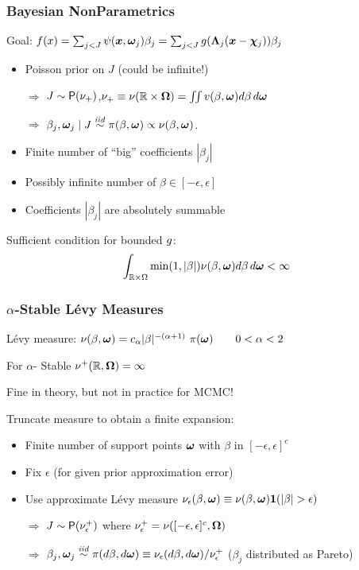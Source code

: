 \documentclass[handout]{beamer}
\newcommand{\bs}[2]{\begin{frame} \frametitle{#1}
{#2}
\end{frame} }
\begin{document}
\bs{Bayesian NonParametrics}{
Goal: $f(x) = \sum_{j < J}  \psi(\bm x, \bm \omega_j) \beta_j = \sum_{j <
  J} g(\bm \Lambda_j(\bm x - \bm \chi_j)) \beta_j$
\pause


\pause

\begin{itemize}
\item Poisson prior on $J$  (could be infinite!)
\item[$\Rightarrow$] $J \sim \mbox{\sf P}(\nu_+)$,\qquad $\nu_+\equiv
  \nu(\mathbb{R}\times\bm \Omega) = \iint v(\beta, \bm \omega) d \beta \,
  d\bm \omega$  \pause
\item[$\Rightarrow$] $\beta_j,\bm \omega_j \mid J \mathrel{\mathop{\sim}\limits^{\mathit{iid}}} \pi(\beta, \bm \omega)
  \propto \nu(\beta,\bm \omega)$. \pause
\end{itemize}

\begin{itemize}
  \item Finite number of ``big'' coefficients $|\beta_j|$ \pause
  \item Possibly infinite number of $\beta \in [-\epsilon, \epsilon]$ \pause
  \item Coefficients $|\beta_j|$ are absolutely summable \pause
 \end{itemize}

{Sufficient condition} for bounded $g$:
\begin{equation}
  \label{eq:l1-bound}
\int_{\mathbb{R} \times \Omega} \min(1, |\beta|) \nu(\beta,
  \bm \omega)d \beta \,
  d\bm \omega  < \infty
\end{equation}


}


\bs{$\alpha$-Stable L\'evy Measures} {

L\'evy measure: $\nu(\beta, \bm \omega) =  c_\alpha |\beta|^{-(\alpha
    +1)}\ \pi(\bm \omega) \qquad 0 < \alpha < 2$ \pause

For $\alpha$- Stable $\nu^+(\mathbb{R}, \bm \Omega) = \infty$ \pause

Fine in theory, but not in practice for MCMC! \pause

\vspace{14pt}
Truncate measure to obtain a finite expansion:
\begin{itemize}
 \item Finite number of support points $\bm \omega$ with $\beta$ in
   $[-\epsilon, \epsilon]^c$  \pause
\item Fix $\epsilon$  (for given prior approximation error) \pause
\item Use approximate L\'evy  measure
$\nu_{\epsilon}(\beta, \bm \omega) \equiv \nu(\beta,
\bm \omega){\bm 1}(|\beta| > \epsilon) $ \pause
\item[$\Rightarrow$] $J \sim \mbox{\sf P}(\nu_{\epsilon}^+)$ where
  $\nu^+_{\epsilon} = \nu([-\epsilon, \epsilon]^c, \bm \Omega)$ \pause
\item[$\Rightarrow$]  $\beta_j, \bm \omega_j \mathrel{\mathop{\sim}\limits^{\mathit{iid}}} \pi(d\beta, d\bm \omega) \equiv
  \nu_\epsilon(d\beta , d \bm \omega)/\nu^+_{\epsilon}$ ($\beta_j$
  distributed as Pareto)

\end{itemize}
}
\end{document}
